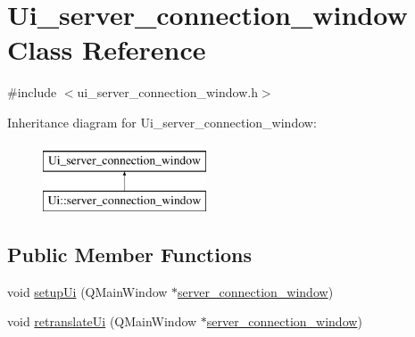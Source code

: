 \hypertarget{classUi__server__connection__window}{\section{Ui\-\_\-server\-\_\-connection\-\_\-window Class Reference}
\label{classUi__server__connection__window}
}


{\ttfamily \#include $<$ui\-\_\-server\-\_\-connection\-\_\-window.\-h$>$}

Inheritance diagram for Ui\-\_\-server\-\_\-connection\-\_\-window\-:\begin{figure}[H]
\begin{center}
\leavevmode
\includegraphics[height=2.000000cm]{classUi__server__connection__window}
\end{center}
\end{figure}
\subsection*{Public Member Functions}
\begin{DoxyCompactItemize}
\item 
void \hyperlink{classUi__server__connection__window_acbdbebbb76dc1504d0b63bdc3b7ad75a}{setup\-Ui} (Q\-Main\-Window $\ast$\hyperlink{classserver__connection__window}{server\-\_\-connection\-\_\-window})
\item 
void \hyperlink{classUi__server__connection__window_ab315b21ffbaaf416bbe1bc639798e666}{retranslate\-Ui} (Q\-Main\-Window $\ast$\hyperlink{classserver__connection__window}{server\-\_\-connection\-\_\-window})
\end{DoxyCompactItemize}
